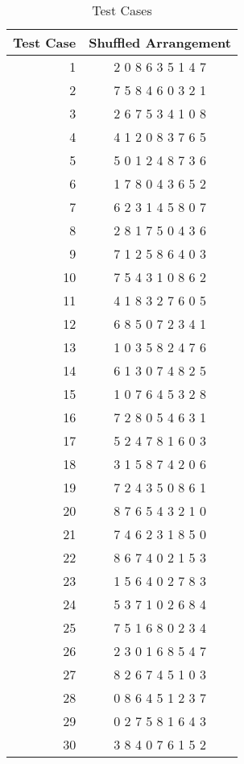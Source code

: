 \begin{table}[ht]
  \centering
  \begin{adjustbox}{width=0.6\textwidth,center}

\begin{tabular}{r|c}
  \toprule
  \textbf{Test Case} & \textbf{Shuffled Arrangement} \\
  \midrule
1 & 2 0 8 6 3 5 1 4 7 \\ \hline
2 & 7 5 8 4 6 0 3 2 1 \\ \hline
3 & 2 6 7 5 3 4 1 0 8 \\ \hline
4 & 4 1 2 0 8 3 7 6 5 \\ \hline
5 & 5 0 1 2 4 8 7 3 6 \\ \hline
6 & 1 7 8 0 4 3 6 5 2 \\ \hline
7 & 6 2 3 1 4 5 8 0 7 \\ \hline
8 & 2 8 1 7 5 0 4 3 6 \\ \hline
9 & 7 1 2 5 8 6 4 0 3 \\ \hline
10 & 7 5 4 3 1 0 8 6 2 \\ \hline
11 & 4 1 8 3 2 7 6 0 5 \\ \hline
12 & 6 8 5 0 7 2 3 4 1 \\ \hline
13 & 1 0 3 5 8 2 4 7 6 \\ \hline
14 & 6 1 3 0 7 4 8 2 5 \\ \hline
15 & 1 0 7 6 4 5 3 2 8 \\ \hline
16 & 7 2 8 0 5 4 6 3 1 \\ \hline
17 & 5 2 4 7 8 1 6 0 3 \\ \hline
18 & 3 1 5 8 7 4 2 0 6 \\ \hline
19 & 7 2 4 3 5 0 8 6 1 \\ \hline
20 & 8 7 6 5 4 3 2 1 0 \\ \hline
21 & 7 4 6 2 3 1 8 5 0 \\ \hline
22 & 8 6 7 4 0 2 1 5 3 \\ \hline
23 & 1 5 6 4 0 2 7 8 3 \\ \hline
24 & 5 3 7 1 0 2 6 8 4 \\ \hline
25 & 7 5 1 6 8 0 2 3 4 \\ \hline
26 & 2 3 0 1 6 8 5 4 7 \\ \hline
27 & 8 2 6 7 4 5 1 0 3 \\ \hline
28 & 0 8 6 4 5 1 2 3 7 \\ \hline
29 & 0 2 7 5 8 1 6 4 3 \\ \hline
30 & 3 8 4 0 7 6 1 5 2
\end{tabular}
\end{adjustbox}

\caption{Test Cases}
\end{table}

